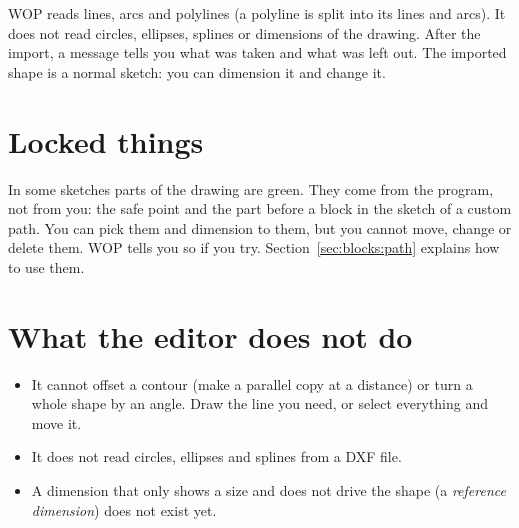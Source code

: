 WOP reads lines, arcs and polylines (a polyline is split into its lines and arcs). It does not read circles, ellipses, splines or dimensions of the drawing. After the import, a message tells you what was taken and what was left out. The imported shape is a normal sketch: you can dimension it and change it.

\section{Locked things}\label{sec:sketch:locked}

In some sketches parts of the drawing are \textcolor{green!45!black}{green}. They come from the program, not from you: the safe point and the part before a block in the sketch of a custom path. You can pick them and dimension to them, but you cannot move, change or delete them. WOP tells you so if you try. Section~\ref{sec:blocks:path} explains how to use them.

\section{What the editor does not do}\label{sec:sketch:limits}

\begin{itemize}
\item It cannot offset a contour (make a parallel copy at a distance) or turn a whole shape by an angle. Draw the line you need, or select everything and move it.
\item It does not read circles, ellipses and splines from a DXF file.
\item A dimension that only shows a size and does not drive the shape (a \emph{reference dimension}) does not exist yet.
\end{itemize}
